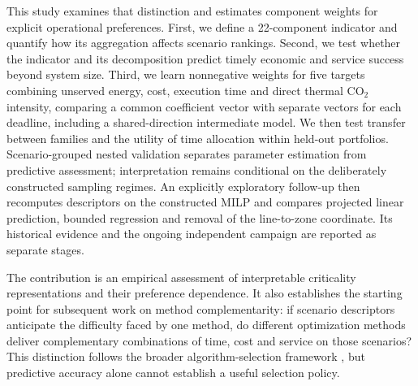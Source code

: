 This study examines that distinction and estimates component weights for
explicit operational preferences. First, we define a 22-component indicator
and quantify how its aggregation affects scenario rankings. Second, we test
whether the indicator and its decomposition predict timely economic and
service success beyond system size. Third, we learn nonnegative weights for
five targets combining unserved energy, cost, execution time and direct
thermal CO$_2$ intensity, comparing a common coefficient vector with separate
vectors for each deadline, including a shared-direction intermediate
model. We then test transfer between families and the utility of time
allocation within held-out portfolios. Scenario-grouped nested validation separates
parameter estimation from predictive assessment; interpretation remains
conditional on the deliberately constructed sampling regimes.
An explicitly exploratory follow-up then recomputes descriptors on the
constructed MILP and compares projected linear prediction, bounded regression
and removal of the line-to-zone coordinate. Its historical evidence and the
ongoing independent campaign are reported as separate stages.

The contribution is an empirical assessment of interpretable criticality
representations and their preference dependence. It also establishes the
starting point for subsequent work on method complementarity: if
scenario descriptors anticipate the difficulty faced by one method, do
different optimization methods deliver complementary combinations of time,
cost and service on those scenarios? This distinction follows the broader
algorithm-selection framework \citep{rice1976,xu2008,bischl2016}, but predictive
accuracy alone cannot establish a useful selection policy.

